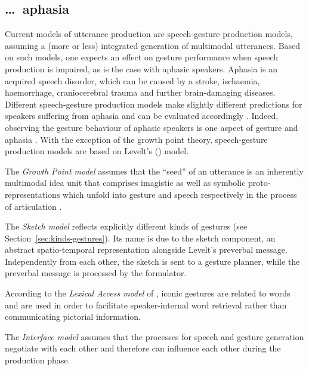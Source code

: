 \documentclass[output=paper
                ,modfonts
                ,nonflat
	        ,collection
	        ,collectionchapter
	        ,collectiontoclongg
 	        ,biblatex
                ,babelshorthands
                ,newtxmath
                ,draftmode
                ,colorlinks, citecolor=brown
]{./langsci/langscibook}
\begin{document}
\subsection{\ldots\ aphasia}
\label{sec:aphasia}

Current models of utterance production are speech-gesture production models, assuming a (more or less) integrated generation of multimodal utterances.
%
Based on such models, one expects an effect on gesture performance when speech production is impaired, as is the case with aphasic speakers. 
%
Aphasia  is an acquired speech disorder, which can be caused by a stroke, ischaemia, haemorrhage, craniocerebral trauma and further brain-damaging diseases.
%
Different speech-gesture production models make slightly different predictions for speakers suffering from aphasia and can be evaluated accordingly \citep{deRuiter:deBeer:2013}.
%
Indeed, observing the gesture behaviour of aphasic speakers is one aspect of gesture and aphasia \citep{Jakob:Bartmann:Goldenberg:Ziegler:Hogrefe:2011,Kong:Law:Chak:2017,Sekine:Rose:2013}.
%
With the exception of the growth point theory, speech-gesture production models are based on Levelt's (\citeyear{Levelt:1989})  model.

The \emph{Growth Point model} \citep{McNeill:Duncan:2000} assumes that the \enquote{seed} of an utterance is an inherently multimodal idea unit that comprises imagistic as well as symbolic proto-representations which unfold into gesture and speech respectively in the process of articulation \citetext{see also \citealt{Roepke:2011} on the growth point's entrenchment in contexts and frames}.

The \emph{Sketch model}  \citep{de:Ruiter:2000} reflects explicitly different kinds of gestures (see Section~\ref{sec:kinds-gestures}). 
%
Its name is due to the sketch component, an abstract spatio-temporal representation alongside Levelt's preverbal message. 
%
Independently from each other, the sketch is sent to a gesture planner, while the preverbal message is processed by the formulator.

According to the \emph{Lexical Access model}  of \citet{Krauss:Chen:Gottesmann:2000}, iconic gestures are related to words and are used in order to facilitate speaker-internal word retrieval rather than communicating pictorial information.

The \emph{Interface model}  \citep{Kita:Ozyurek:2003} assumes that the processes for speech and gesture generation negotiate with each other and therefore can influence each other during the production phase.
\end{document}
